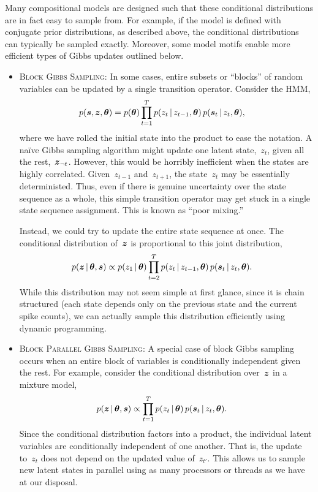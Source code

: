 Many compositional models are designed such that these conditional 
distributions are in fact easy to sample from. For example, if the 
model is defined with conjugate prior distributions, as described
above, the conditional
distributions can typically be sampled exactly. Moreover, some model 
motifs enable more efficient types of Gibbs updates outlined below.

\begin{itemize}
\item \textsc{Block Gibbs Sampling}:
  In some cases, entire subsets or ``blocks'' of random variables can 
  be updated by a single transition operator. Consider the HMM,
  \begin{align*}
    p(\boldsymbol{s}, \boldsymbol{z}, \boldsymbol{\theta}) 
    &= p(\boldsymbol{\theta})
      \prod_{t=1}^T p(z_t \,|\, z_{t-1}, \boldsymbol{\theta}) \, 
      p(\boldsymbol{s}_t \,|\, z_t, \boldsymbol{\theta}),
  \end{align*}
  where we have rolled the initial state into the product to ease the
  notation. A na\"ive Gibbs sampling algorithm might update one latent
  state,~$z_t$, given all the rest,~$\boldsymbol{z}_{\neg t}$. However, this
  would be horribly inefficient when the states are highly
  correlated. Given~$z_{t-1}$ and~$z_{t+1}$, the state~$z_t$ may be
  essentially deterministed. Thus, even if there is genuine
  uncertainty over the state sequence as a whole, this simple
  transition operator may get stuck in a single state sequence assignment.
  This is known as ``poor mixing.''

  Instead, we could try to update the entire state sequence at once. 
  The conditional distribution of~$\boldsymbol{z}$ is proportional to this joint 
  distribution,
  \begin{align*}
    p(\boldsymbol{z} \,|\, \boldsymbol{\theta}, \boldsymbol{s}) 
    &\propto p(z_1 \,|\, \boldsymbol{\theta}) \prod_{t=2}^T p(z_t \,|\, z_{t-1}, \boldsymbol{\theta}) \, 
      p(\boldsymbol{s}_t \,|\, z_t, \boldsymbol{\theta}).
  \end{align*}
  While this distribution may not seem simple at first glance, since it 
  is chain structured (each state depends only on the previous state and 
  the current spike counts), we can actually sample this distribution 
  efficiently using dynamic programming.
  
\item \textsc{Block Parallel Gibbs Sampling}:
  A special case of block Gibbs sampling occurs when an entire block 
  of variables is conditionally independent given the rest. For example,
  consider the conditional distribution over~$\boldsymbol{z}$ in a mixture model,
  \begin{align*}
    p(\boldsymbol{z} \,|\, \boldsymbol{\theta}, \boldsymbol{s}) 
    &\propto \prod_{t=1}^T p(z_t \,|\, \boldsymbol{\theta}) \,
      p(\boldsymbol{s}_t \,|\, z_t, \boldsymbol{\theta}).
  \end{align*}
  Since the conditional distribution factors into a product, the individual
  latent variables are conditionally independent of one another. That is, the 
  update to~$z_t$ does not depend on the updated value of~$z_{t'}$. This 
  allows us to sample new latent states in parallel using as many processors
  or threads as we have at our disposal.


\end{itemize}
